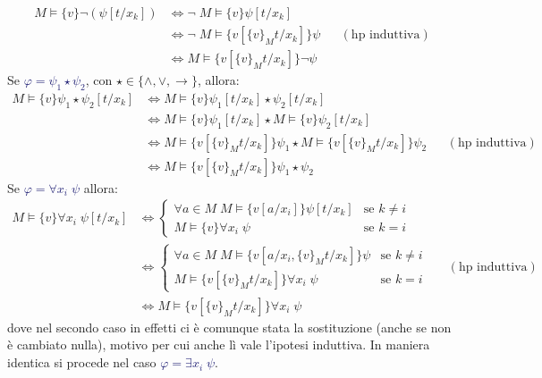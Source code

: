 \begin{soln}
\begin{itemize}
\begin{align*}
                M \models\{v\} \neg (\psi[t/x_k]) & \iff \neg \; M \models\{v\} \psi[t/x_k] \\
                                                  & \iff \neg \; M \models\{v[\{v\}_M t/x_k]\} \psi &&(\text{hp induttiva})\\
                                                  & \iff M \models\{v[\{v\}_M t/x_k]\} \neg \psi
            \end{align*}
        Se \textcolor{MidnightBlue}{$\varphi = \psi_1 \star \psi_2$}, con $\star \in \{\land, \lor, \to\}$, allora:
            \begin{align*}
                M \models\{v\} \psi_1 \star \psi_2[t/x_k] & \iff M \models\{v\} \psi_1[t/x_k] \star \psi_2[t/x_k] \\
                                                          & \iff M \models\{v\} \psi_1[t/x_k] \star M \models\{v\} \psi_2[t/x_k] \\
                                                          & \iff M \models\{v[\{v\}_M t/x_k]\} \psi_1 \star M \models\{v[\{v\}_M t/x_k]\} \psi_2 &&(\text{hp induttiva})\\
                                                          & \iff M \models\{v[\{v\}_M t/x_k]\} \psi_1 \star \psi_2
            \end{align*}
        Se \textcolor{MidnightBlue}{$\varphi = \forall x_i \; \psi$} allora:
        \begin{align*}
            M \models\{v\} \forall x_i \; \psi[t/x_k] & \iff \begin{cases} \forall a \in M \; M \models\{v[a/x_i]\} \psi[t/x_k] &\text{se $k \ne i$} \\ M \models\{v\} \forall x_i \; \psi &\text{se $k = i$} \end{cases} \\
                                                      & \iff \begin{cases} \forall a \in M \; M \models\{v[a/x_i,\{v\}_M t/x_k]\} \psi &\text{se $k \ne i$} \\ M \models\{v[\{v\}_M t/x_k]\} \forall x_i \; \psi &\text{se $k = i$} \end{cases} &&(\text{hp induttiva})\\
                                                      & \iff M \models\{v[\{v\}_M t/x_k]\} \forall x_i \; \psi 
        \end{align*}
        dove nel secondo caso in effetti ci è comunque stata la sostituzione (anche se non è cambiato nulla), motivo per cui anche lì vale l'ipotesi induttiva. In maniera identica si procede nel caso \textcolor{MidnightBlue}{$\varphi = \exists x_i \; \psi$}.
    \end{itemize}
\end{soln}

